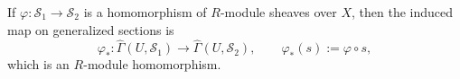 If $\varphi : \mathcal{S}_1 \to \mathcal{S}_2$ is a homomorphism of $R$-module sheaves over $X$, then the induced map on generalized sections is
$$
\varphi_* : \hat{\Gamma}(U, \mathcal{S}_1) \to \hat{\Gamma}(U, \mathcal{S}_2), \qquad \varphi_*(s) := \varphi \circ s,
$$
which is an $R$-module homomorphism.
